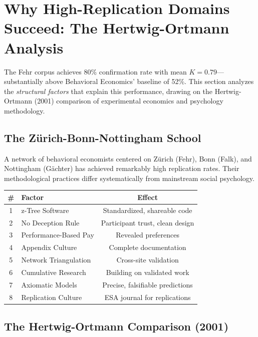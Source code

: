 \documentclass[11pt,a4paper]{article}
\theoremstyle{remark}
\begin{document}
\section{Why High-Replication Domains Succeed: The Hertwig-Ortmann Analysis}
\label{sec:hertwig-ortmann}

The Fehr corpus achieves 80\% confirmation rate with mean $K = 0.79$---substantially above Behavioral Economics' baseline of 52\%. This section analyzes the \textit{structural factors} that explain this performance, drawing on the Hertwig-Ortmann (2001) comparison of experimental economics and psychology methodology.

\subsection{The Zürich-Bonn-Nottingham School}

A network of behavioral economists centered on Zürich (Fehr), Bonn (Falk), and Nottingham (Gächter) has achieved remarkably high replication rates. Their methodological practices differ systematically from mainstream social psychology.

\begin{keyinsight}[title={The 8 Structural Factors}]
\begin{center}
\begin{tabular}{clc}
\toprule
\textbf{\#} & \textbf{Factor} & \textbf{Effect} \\
\midrule
1 & z-Tree Software & Standardized, shareable code \\
2 & No Deception Rule & Participant trust, clean design \\
3 & Performance-Based Pay & Revealed preferences \\
4 & Appendix Culture & Complete documentation \\
5 & Network Triangulation & Cross-site validation \\
6 & Cumulative Research & Building on validated work \\
7 & Axiomatic Models & Precise, falsifiable predictions \\
8 & Replication Culture & ESA journal for replications \\
\bottomrule
\end{tabular}
\end{center}
\end{keyinsight}

\subsection{The Hertwig-Ortmann Comparison (2001)}
\end{document}

